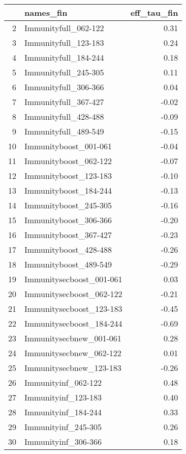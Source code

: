 \begin{table}[ht]
\centering
\begin{tabular}{rlr}
  \hline
 & names\_fin & eff\_tau\_fin \\ 
  \hline
2 & Immunityfull\_062-122 & 0.31 \\ 
  3 & Immunityfull\_123-183 & 0.24 \\ 
  4 & Immunityfull\_184-244 & 0.18 \\ 
  5 & Immunityfull\_245-305 & 0.11 \\ 
  6 & Immunityfull\_306-366 & 0.04 \\ 
  7 & Immunityfull\_367-427 & -0.02 \\ 
  8 & Immunityfull\_428-488 & -0.09 \\ 
  9 & Immunityfull\_489-549 & -0.15 \\ 
  10 & Immunityboost\_001-061 & -0.04 \\ 
  11 & Immunityboost\_062-122 & -0.07 \\ 
  12 & Immunityboost\_123-183 & -0.10 \\ 
  13 & Immunityboost\_184-244 & -0.13 \\ 
  14 & Immunityboost\_245-305 & -0.16 \\ 
  15 & Immunityboost\_306-366 & -0.20 \\ 
  16 & Immunityboost\_367-427 & -0.23 \\ 
  17 & Immunityboost\_428-488 & -0.26 \\ 
  18 & Immunityboost\_489-549 & -0.29 \\ 
  19 & Immunitysecboost\_001-061 & 0.03 \\ 
  20 & Immunitysecboost\_062-122 & -0.21 \\ 
  21 & Immunitysecboost\_123-183 & -0.45 \\ 
  22 & Immunitysecboost\_184-244 & -0.69 \\ 
  23 & Immunitysecbnew\_001-061 & 0.28 \\ 
  24 & Immunitysecbnew\_062-122 & 0.01 \\ 
  25 & Immunitysecbnew\_123-183 & -0.26 \\ 
  26 & Immunityinf\_062-122 & 0.48 \\ 
  27 & Immunityinf\_123-183 & 0.40 \\ 
  28 & Immunityinf\_184-244 & 0.33 \\ 
  29 & Immunityinf\_245-305 & 0.26 \\ 
  30 & Immunityinf\_306-366 & 0.18 \\ 

\end{tabular}
\end{table}
